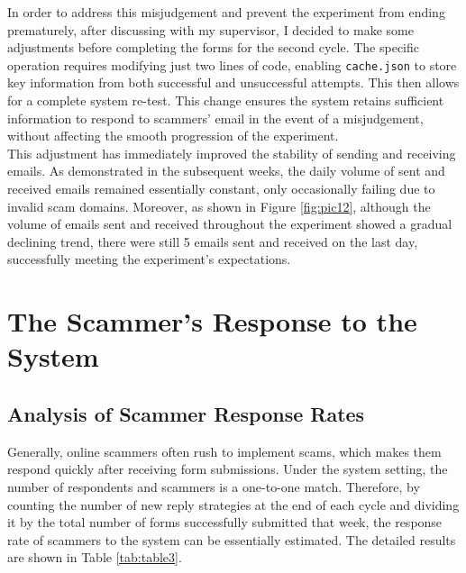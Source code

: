\documentclass[ oneside,%
                    author={Cassie Qing Tang},
                    degree={BSc},
                     title={An Automated Response System for Disrupting Online Pet Scamming \\ },
                    subtitle={ }]{dissertation}
\begin{document}
In order to address this misjudgement and prevent the experiment from ending prematurely, after discussing with my supervisor, I decided to make some adjustments before completing the forms for the second cycle. The specific operation requires modifying just two lines of code, enabling \texttt{cache.json} to store key information from both successful and unsuccessful attempts. This then allows for a complete system re-test. This change ensures the system retains sufficient information to respond to scammers' email in the event of a misjudgement, without affecting the smooth progression of the experiment.
\\

This adjustment has immediately improved the stability of sending and receiving emails. As demonstrated in the subsequent weeks, the daily volume of sent and received emails remained essentially constant, only occasionally failing due to invalid scam domains. Moreover, as shown in Figure \ref{fig:pic12}, although the volume of emails sent and received throughout the experiment showed a gradual declining trend, there were still 5 emails sent and received on the last day, successfully meeting the experiment's expectations.

\section{The Scammer's Response to the System}
\subsection{Analysis of Scammer Response Rates}
Generally, online scammers often rush to implement scams, which makes them respond quickly after receiving form submissions. Under the system setting, the number of respondents and scammers is a one-to-one match. Therefore, by counting the number of new reply strategies at the end of each cycle and dividing it by the total number of forms successfully submitted that week, the response rate of scammers to the system can be essentially estimated. The detailed results are shown in Table \ref{tab:table3}.
{\small
\begin{table}[ht]
\centering
{}
\caption{Email Response Rate of Pet Scammers to the System}
\label{tab:table3}
\end{table}
} 
\end{document}
